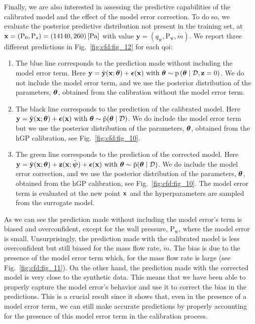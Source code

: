 Finally, we are also interested in assessing the predictive capabilities of the calibrated model and the effect of the model error correction. To do so, we evaluate the posterior predictive distribution not present in the training set, at $\mathbf{x} = (\mathrm{P}_0, \mathrm{P}_s) = (14140, 260)\, \mathrm{[Pa]}$ with value $\mathbf{y} = (q_{\mathrm{w}}, \mathrm{P}_{\mathrm{w}}, \dot{m})$. We report three different predictions in Fig.~\ref{fig:cfd:fig_12} for each \gls{qoi}:
\begin{enumerate}

  \item The blue line corresponds to the prediction made without including the model error term. Here $\mathbf{y} = \hat{\mathbf{y}}(\mathbf{x}; \boldsymbol{\theta}) + \boldsymbol{\epsilon}(\mathbf{x}) \text{ with } \boldsymbol{\theta} \sim \mathrm{p} \left( \boldsymbol{\theta} \mid \mathcal{D}, \mathbf{z}=0 \right)$. We do not include the model error term, and we use the posterior distribution of the parameters, $\boldsymbol{\theta}$, obtained from the calibration without the model error term.
  \item The black line corresponds to the prediction of the calibrated model. Here $\mathbf{y} = \hat{\mathbf{y}}(\mathbf{x}; \boldsymbol{\theta}) + \boldsymbol{\epsilon}(\mathbf{x}) \text{ with } \boldsymbol{\theta} \sim \tilde{\text{p}}(\boldsymbol{\theta} \mid \mathcal{D})$. We do include the model error term but we use the posterior distribution of the parameters, $\boldsymbol{\theta}$, obtained from the hGP calibration, see Fig.~\ref{fig:cfd:fig_10}.
  \item The green line corresponds to the prediction of the corrected model. Here $\mathbf{y} = \hat{\mathbf{y}}(\mathbf{x}; \boldsymbol{\theta}) + \mathbf{z}(\mathbf{x}; \tilde{\boldsymbol{\psi}}) + \boldsymbol{\epsilon}(\mathbf{x}) \text{ with } \boldsymbol{\theta} \sim \tilde{\text{p}}(\boldsymbol{\theta} \mid \mathcal{D})$. We do include the model error correction, and we use the posterior distribution of the parameters, $\boldsymbol{\theta}$, obtained from the hGP calibration, see Fig.~\ref{fig:cfd:fig_10}. The model error term is evaluated at the new point $\mathbf{x}$ and the hyperparameters are sampled from the surrogate model.
\end{enumerate}

As we can see the prediction made without including the model error's term is biased and overconfident, except for the wall pressure, $\mathrm{P}_{\mathrm{w}}$, where the model error is small. Unsurprisingly, the prediction made with the calibrated model is less overconfident but still biased for the mass flow rate, $\dot{m}$. The bias is due to the presence of the model error term which, for the mass flow rate is large (see Fig.~\ref{fig:cfd:fig_11}). On the other hand, the prediction made with the corrected model is very close to the synthetic data. This means that we have been able to properly capture the model error's behavior and use it to correct the bias in the predictions. This is a crucial result since it shows that, even in the presence of a model error term, we can still make accurate predictions by properly accounting for the presence of this model error term in the calibration process.


